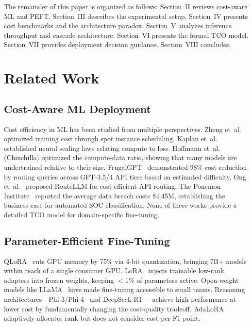 \documentclass[review,3p]{elsarticle}
\begin{document}
The remainder of this paper is organized as follows: Section~II reviews cost-aware ML and PEFT. Section~III describes the experimental setup. Section~IV presents cost benchmarks and the architecture paradox. Section~V analyzes inference throughput and cascade architecture. Section~VI presents the formal TCO model. Section~VII provides deployment decision guidance. Section~VIII concludes.

\section{Related Work}

\subsection{Cost-Aware ML Deployment}
Cost efficiency in ML has been studied from multiple perspectives. Zheng et~al.~\cite{zheng2022} optimized training cost through spot instance scheduling. Kaplan et~al.~\cite{kaplan2020} established neural scaling laws relating compute to loss. Hoffmann et~al.~\cite{hoffmann2022} (Chinchilla) optimized the compute-data ratio, showing that many models are undertrained relative to their size. FrugalGPT~\cite{chen2023} demonstrated 98\% cost reduction by routing queries across GPT-3.5/4 API tiers based on estimated difficulty. Ong et~al.~\cite{ong2024} proposed RouteLLM for cost-efficient API routing. The Ponemon Institute~\cite{ponemon2023} reported the average data breach costs \$4.45M, establishing the business case for automated SOC classification. None of these works provide a detailed TCO model for domain-specific fine-tuning.

\subsection{Parameter-Efficient Fine-Tuning}
QLoRA~\cite{dettmers2023} cuts GPU memory by 75\% via 4-bit quantization, bringing 7B+ models within reach of a single consumer GPU. LoRA~\cite{hu2022} injects trainable low-rank adapters into frozen weights, keeping $<$1\% of parameters active. Open-weight models like LLaMA~\cite{touvron2023} have made fine-tuning accessible to small teams. Reasoning architectures---Phi-3/Phi-4~\cite{abdin2024} and DeepSeek-R1~\cite{guo2025}---achieve high performance at lower cost by fundamentally changing the cost-quality tradeoff. AdaLoRA~\cite{zhang2023} adaptively allocates rank but does not consider cost-per-F1-point.
\end{document}
